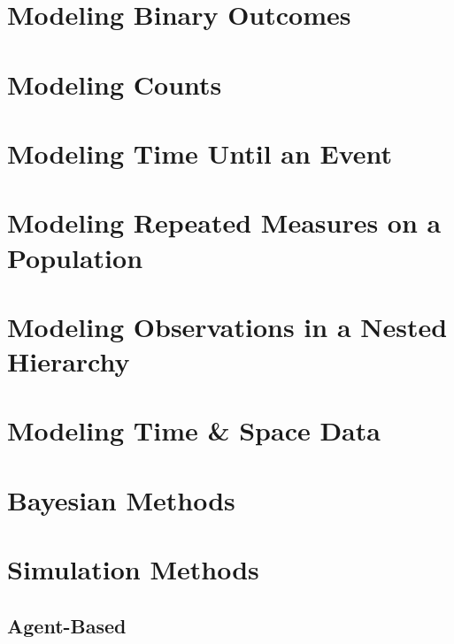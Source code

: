 \documentclass[
]{krantz}
\begin{document}
\hypertarget{modeling-binary-outcomes}{%
\section{Modeling Binary Outcomes}\label{modeling-binary-outcomes}}

\hypertarget{modeling-counts}{%
\section{Modeling Counts}\label{modeling-counts}}

\hypertarget{modeling-time-until-an-event}{%
\section{Modeling Time Until an Event}\label{modeling-time-until-an-event}}

\hypertarget{modeling-repeated-measures-on-a-population}{%
\section{Modeling Repeated Measures on a Population}\label{modeling-repeated-measures-on-a-population}}

\hypertarget{modeling-observations-in-a-nested-hierarchy}{%
\section{Modeling Observations in a Nested Hierarchy}\label{modeling-observations-in-a-nested-hierarchy}}

\hypertarget{modeling-time-space-data}{%
\section{Modeling Time \& Space Data}\label{modeling-time-space-data}}

\hypertarget{bayesian-methods}{%
\section{Bayesian Methods}\label{bayesian-methods}}

\hypertarget{simulation-methods}{%
\section{Simulation Methods}\label{simulation-methods}}

\hypertarget{agent-based}{%
\subsection{Agent-Based}\label{agent-based}}
\end{document}
